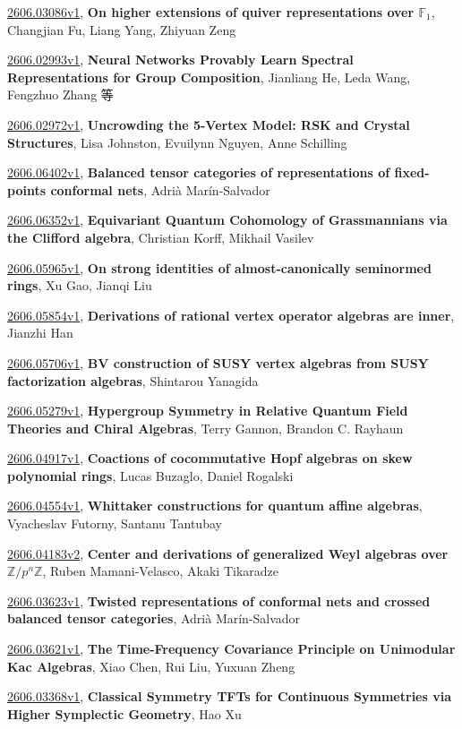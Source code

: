 \documentclass[9pt, a4paper]{article}
\theoremstyle{plain}
\theoremstyle{definition}
\theoremstyle{remark}
\newcommand{\arxiv}[3]{\href{https://arxiv.org/abs/#1}{#1}, \textbf{\textcolor{arxivblue}{#2}}, #3}
\begin{document}
\arxiv{2606.03086v1}{On higher extensions of quiver representations over $\mathbb{F}_1$}{Changjian Fu, Liang Yang, Zhiyuan Zeng}

\arxiv{2606.02993v1}{Neural Networks Provably Learn Spectral Representations for Group Composition}{Jianliang He, Leda Wang, Fengzhuo Zhang 等}

\arxiv{2606.02972v1}{Uncrowding the 5-Vertex Model: RSK and Crystal Structures}{Lisa Johnston, Evuilynn Nguyen, Anne Schilling}

\arxiv{2606.06402v1}{Balanced tensor categories of representations of fixed-points conformal nets}{Adrià Marín-Salvador}

\arxiv{2606.06352v1}{Equivariant Quantum Cohomology of Grassmannians via the Clifford algebra}{Christian Korff, Mikhail Vasilev}

\arxiv{2606.05965v1}{On strong identities of almost-canonically seminormed rings}{Xu Gao, Jianqi Liu}

\arxiv{2606.05854v1}{Derivations of rational vertex operator algebras are inner}{Jianzhi Han}

\arxiv{2606.05706v1}{BV construction of SUSY vertex algebras from SUSY factorization algebras}{Shintarou Yanagida}

\arxiv{2606.05279v1}{Hypergroup Symmetry in Relative Quantum Field Theories and Chiral Algebras}{Terry Gannon, Brandon C. Rayhaun}

\arxiv{2606.04917v1}{Coactions of cocommutative Hopf algebras on skew polynomial rings}{Lucas Buzaglo, Daniel Rogalski}

\arxiv{2606.04554v1}{Whittaker constructions for quantum affine algebras}{Vyacheslav Futorny, Santanu Tantubay}

\arxiv{2606.04183v2}{Center and derivations of generalized Weyl algebras over $\mathbb{Z}/p^n\mathbb{Z}$}{Ruben Mamani-Velasco, Akaki Tikaradze}

\arxiv{2606.03623v1}{Twisted representations of conformal nets and crossed balanced tensor categories}{Adrià Marín-Salvador}

\arxiv{2606.03621v1}{The Time-Frequency Covariance Principle on Unimodular Kac Algebras}{Xiao Chen, Rui Liu, Yuxuan Zheng}

\arxiv{2606.03368v1}{Classical Symmetry TFTs for Continuous Symmetries via Higher Symplectic Geometry}{Hao Xu}

\end{document}
